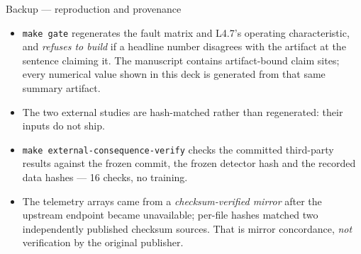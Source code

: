 \documentclass[aspectratio=169,11pt]{beamer}
\begin{document}
\begin{frame}{Backup --- reproduction and provenance}
  \small
  \begin{itemize}\setlength\itemsep{0.4em}
    \item \texttt{make gate} regenerates the fault matrix and L4.7's operating characteristic,
          and \emph{refuses to build} if a headline number disagrees with the artifact at the
          sentence claiming it. The manuscript contains \Nclaimsites{} artifact-bound claim
          sites; every numerical value shown in this deck is generated from that same summary
          artifact.
    \item The two external studies are hash-matched rather than regenerated: their inputs do
          not ship.
    \item \texttt{make external-consequence-verify} checks the committed third-party results
          against the frozen commit, the frozen detector hash and the recorded data hashes ---
          16 checks, no training.
    \item The telemetry arrays came from a \emph{checksum-verified mirror} after the upstream
          endpoint became unavailable; per-file hashes matched two independently published
          checksum sources. That is mirror concordance, \emph{not} verification by the original
          publisher.
  \end{itemize}
\end{frame}
\end{document}
